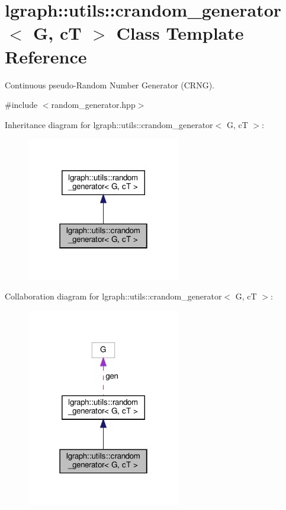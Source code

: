 \hypertarget{classlgraph_1_1utils_1_1crandom__generator}{}\section{lgraph\+:\+:utils\+:\+:crandom\+\_\+generator$<$ G, cT $>$ Class Template Reference}
\label{classlgraph_1_1utils_1_1crandom__generator}


Continuous pseudo-\/\+Random Number Generator (C\+R\+NG).  




{\ttfamily \#include $<$random\+\_\+generator.\+hpp$>$}



Inheritance diagram for lgraph\+:\+:utils\+:\+:crandom\+\_\+generator$<$ G, cT $>$\+:\nopagebreak
\begin{figure}[H]
\begin{center}
\leavevmode
\includegraphics[width=190pt]{classlgraph_1_1utils_1_1crandom__generator__inherit__graph}
\end{center}
\end{figure}


Collaboration diagram for lgraph\+:\+:utils\+:\+:crandom\+\_\+generator$<$ G, cT $>$\+:\nopagebreak
\begin{figure}[H]
\begin{center}
\leavevmode
\includegraphics[width=190pt]{classlgraph_1_1utils_1_1crandom__generator__coll__graph}
\end{center}
\end{figure}

